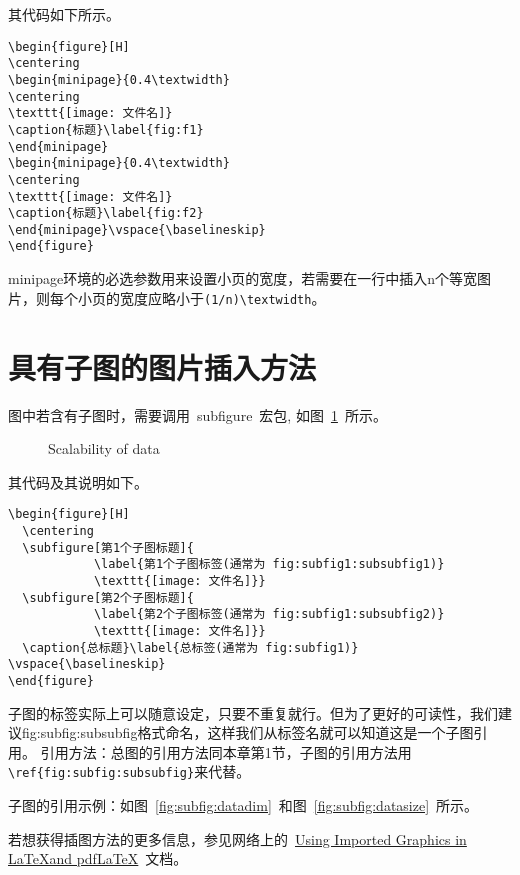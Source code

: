 其代码如下所示。

\lstset{language=tex,tabsize=4}
\begin{lstlisting}
\begin{figure}[H]
\centering
\begin{minipage}{0.4\textwidth}
\centering
\texttt{[image: 文件名]}
\caption{标题}\label{fig:f1}
\end{minipage}
\begin{minipage}{0.4\textwidth}
\centering
\texttt{[image: 文件名]}
\caption{标题}\label{fig:f2}
\end{minipage}\vspace{\baselineskip}
\end{figure}
\end{lstlisting}


minipage环境的必选参数用来设置小页的宽度，若需要在一行中插入n个等宽图片，则每个小页的宽度应略小于\verb|(1/n)\textwidth|。



\section{具有子图的图片插入方法}

图中若含有子图时，需要调用~subfigure~宏包, 如图~\ref{fig:subfig}~所示。
\begin{figure}[H]
  \centering
  \caption{Scalability of data}\label{fig:subfig}
\vspace{\baselineskip}
\end{figure}

其代码及其说明如下。

\lstset{language=tex,tabsize=4}
\begin{lstlisting}
\begin{figure}[H]
  \centering
  \subfigure[第1个子图标题]{
            \label{第1个子图标签(通常为 fig:subfig1:subsubfig1)}
            \texttt{[image: 文件名]}}
  \subfigure[第2个子图标题]{
            \label{第2个子图标签(通常为 fig:subfig1:subsubfig2)}
            \texttt{[image: 文件名]}}
  \caption{总标题}\label{总标签(通常为 fig:subfig1)}
\vspace{\baselineskip}
\end{figure}
\end{lstlisting}




子图的标签实际上可以随意设定，只要不重复就行。但为了更好的可读性，我们建议fig:subfig:subsubfig格式命名，这样我们从标签名就可以知道这是一个子图引用。
引用方法：总图的引用方法同本章第1节，子图的引用方法用\verb|\ref{fig:subfig:subsubfig}|来代替。




子图的引用示例：如图~\ref{fig:subfig:datadim}~和图~\ref{fig:subfig:datasize}~所示。

若想获得插图方法的更多信息，参见网络上的~\href{ftp://ftp.tex.ac.uk/tex-archive/info/epslatex.pdf}{Using Imported Graphics in \LaTeX and pdf\LaTeX}~文档。 